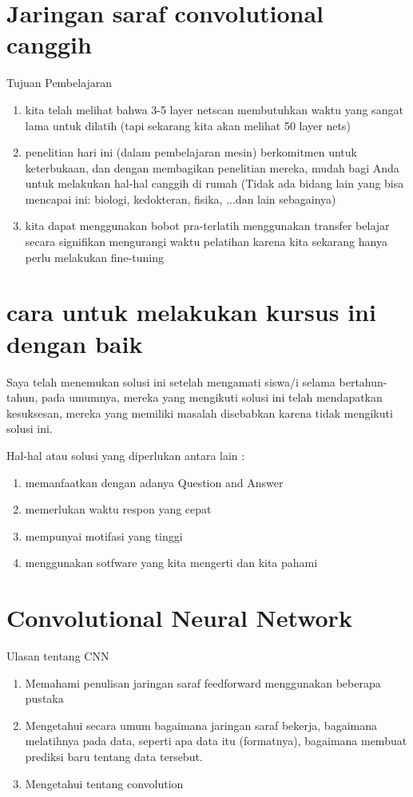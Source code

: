 \section{Jaringan saraf convolutional canggih}
Tujuan Pembelajaran
\begin{enumerate}

\item  kita telah melihat bahwa 3-5 layer netscan membutuhkan waktu yang sangat lama untuk dilatih
(tapi sekarang kita akan melihat 50 layer nets)
\item penelitian hari ini (dalam pembelajaran mesin) berkomitmen untuk keterbukaan, dan dengan membagikan penelitian mereka, mudah bagi Anda untuk melakukan hal-hal canggih di rumah
(Tidak ada bidang lain yang bisa mencapai ini: biologi, kedokteran, fisika, ...dan lain sebagainya)
\item kita dapat menggunakan bobot pra-terlatih menggunakan transfer belajar secara signifikan mengurangi waktu pelatihan karena kita sekarang hanya perlu melakukan fine-tuning
\end{enumerate}

\section{cara untuk melakukan kursus ini dengan baik}
Saya telah menemukan solusi ini setelah mengamati siswa/i selama bertahun-tahun,
pada umumnya, mereka yang mengikuti solusi ini telah mendapatkan kesuksesan, mereka yang memiliki masalah disebabkan karena tidak mengikuti solusi ini.

Hal-hal atau solusi yang diperlukan antara lain :
\begin{enumerate}
\item memanfaatkan dengan adanya Question and Answer  
\item memerlukan waktu respon yang cepat
\item mempunyai motifasi yang tinggi
\item menggunakan sotfware yang kita mengerti dan kita pahami 
\end {enumerate}


\section{Convolutional Neural Network}
Ulasan tentang CNN
\begin{enumerate}

\item Memahami penulisan jaringan saraf feedforward menggunakan beberapa pustaka
\item Mengetahui secara umum bagaimana jaringan saraf bekerja, bagaimana melatihnya pada data, seperti apa data itu (formatnya), bagaimana membuat prediksi baru tentang data tersebut.
\item Mengetahui tentang convolution
\end{enumerate}

